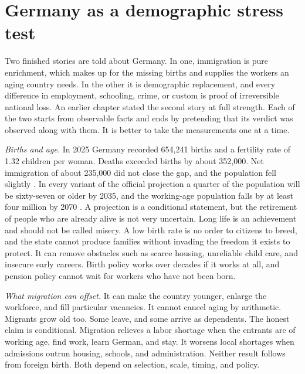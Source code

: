 \documentclass[12pt,a4paper]{book}
\begin{document}
\section{Germany as a demographic stress test}
\label{sec:germany-demographic-stress-test}

Two finished stories are told about Germany. In one, immigration is pure enrichment, which makes up for the missing births and supplies the workers an aging country needs. In the other it is demographic replacement, and every difference in employment, schooling, crime, or custom is proof of irreversible national loss. An earlier chapter stated the second story at full strength. Each of the two starts from observable facts and ends by pretending that its verdict was observed along with them. It is better to take the measurements one at a time.

\emph{Births and age.} In 2025 Germany recorded 654,241 births and a fertility rate of 1.32 children per woman. Deaths exceeded births by about 352,000. Net immigration of about 235,000 did not close the gap, and the population fell slightly \cite{DestatisFertility2026,DestatisPopulation2026}. In every variant of the official projection a quarter of the population will be sixty-seven or older by 2035, and the working-age population falls by at least four million by 2070 \cite{DestatisProjection2025}. A projection is a conditional statement, but the retirement of people who are already alive is not very uncertain. Long life is an achievement and should not be called misery. A low birth rate is no order to citizens to breed, and the state cannot produce families without invading the freedom it exists to protect. It can remove obstacles such as scarce housing, unreliable child care, and insecure early careers. Birth policy works over decades if it works at all, and pension policy cannot wait for workers who have not been born.

\emph{What migration can offset.} It can make the country younger, enlarge the workforce, and fill particular vacancies. It cannot cancel aging by arithmetic. Migrants grow old too. Some leave, and some arrive as dependents. The honest claim is conditional. Migration relieves a labor shortage when the entrants are of working age, find work, learn German, and stay. It worsens local shortages when admissions outrun housing, schools, and administration. Neither result follows from foreign birth. Both depend on selection, scale, timing, and policy.
\end{document}
